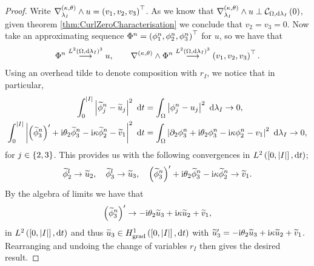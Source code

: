 \begin{proof}
	Write $\nabla_{\lambda_I}^{\left( \kappa, \theta \right)}\wedge u = \left( v_1, v_2, v_3 \right)^\top$.
	As we know that $\nabla_{\lambda_I}^{\left( \kappa, \theta \right)}\wedge u \perp \mathcal{C}_{ \Omega, \mathrm{d}\lambda_I}\left( 0 \right)$, given theorem \ref{thm:CurlZeroCharacterisation} we conclude that $v_2 = v_3 = 0$.
	Now take an approximating sequence $\Phi^n = \left( \phi^n_1, \phi^n_2, \phi^n_3 \right)^\top$ for $u$, so we have that
	\begin{align*}
		\Phi^n \overset{ L^{2}\left( \Omega,\mathrm{d}\lambda_I \right)^3 }{\longrightarrow} u, \qquad \nabla_{}^{\left( \kappa, \theta \right)}\wedge\Phi^n \overset{ L^{2}\left( \Omega,\mathrm{d}\lambda_I \right)^3 }{\longrightarrow} \left( v_1, v_2, v_3 \right)^\top.
	\end{align*}
	Using an overhead tilde to denote composition with $r_I$, we notice that in particular,
	\begin{align*}
		\int_0^{\left\lvert I \right\rvert} \left\lvert \widetilde{\phi}^n_j - \widetilde{u}_j \right\rvert^2 \ \mathrm{d} t
		&= \int_{\Omega} \left\lvert \phi^n_j - u_j \right\rvert^2  \ \mathrm{d}\lambda_I 
		\rightarrow 0, \\
		\int_0^{\left\lvert I \right\rvert} \left\lvert  \left( \widetilde{\phi}^n_3 \right)' + \mathrm{i}\theta_2\widetilde{\phi}^n_3 - \mathrm{i}\kappa\widetilde{\phi}^n_2 - \widetilde{v}_1  \right\rvert^2 \ \mathrm{d} t
		&= \int_{\Omega} \left\lvert  \partial_2\phi^n_3 + \mathrm{i}\theta_2\phi^n_3 - \mathrm{i}\kappa\phi^n_2 - v_1  \right\rvert^2  \ \mathrm{d}\lambda_I
		\rightarrow 0,
	\end{align*}
	for $j\in\left\{ 2,3 \right\}$.
	This provides us with the following convergences in $L^{2}\left( \left[ 0,\left\lvert I \right\rvert \right],\mathrm{d}t \right)$;
	\begin{align*}
		\widetilde{\phi}^l_2 \rightarrow \widetilde{u}_2, \quad
		\widetilde{\phi}^l_3 \rightarrow \widetilde{u}_3, \quad
		\left( \widetilde{\phi}^n_3 \right)' + \mathrm{i}\theta_2\widetilde{\phi}^n_3 - \mathrm{i}\kappa\widetilde{\phi}^n_2 \rightarrow \widetilde{v}_1.
	\end{align*}
	By the algebra of limits we have that
	\begin{align*}
		\left( \widetilde{\phi}^n_3 \right)' \rightarrow -\mathrm{i}\theta_2\widetilde{u}_3 + \mathrm{i}\kappa\widetilde{u}_2 + \widetilde{v}_1,
	\end{align*}
	in $L^{2}\left( \left[ 0,\left\lvert I \right\rvert \right],\mathrm{d}t \right)$ and thus $\widetilde{u}_3\in H^1_\mathrm{grad}\left( \left[ 0,\left\lvert I \right\rvert \right], \mathrm{d}t \right)$ with $\widetilde{u}_3' = -\mathrm{i}\theta_2\widetilde{u}_3 + \mathrm{i}\kappa\widetilde{u}_2 + \widetilde{v}_1$.
	Rearranging and undoing the change of variables $r_I$ then gives the desired result.
\end{proof}

